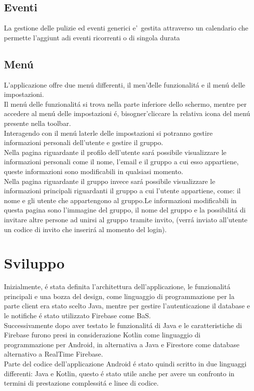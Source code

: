 \subsection{Eventi}
La gestione delle pulizie ed eventi generici e'\ gestita attraverso un calendario
che permette l'aggiunt adi eventi ricorrenti o di singola durata




\subsection{Men\'u}
L'applicazione offre due men\'u differenti, il men'\u delle funzionalit\'a e il men\'u delle impostazioni.\\
Il men\'u delle funzionalit\'a si trova nella parte inferiore dello schermo, mentre per accedere al men\'u delle impostazioni \'e, bisogner'\a cliccare la relativa icona del men\'u presente nella toolbar.\\
Interagendo con il men\'u laterle delle impostazioni si potranno gestire informazioni personali dell'utente e gestire il gruppo.\\
Nella pagina riguardante il profilo dell'utente sar\'a possibile visualizzare le informazioni personali come il nome, l'email e il gruppo a cui esso appartiene, queste informazioni sono modificabili in qualsiasi momento.\\
Nella pagina riguardante il gruppo invece sar\'a possibile visualizzare le informazioni principali riguardanti il gruppo a cui l'utente appartiene, come: il nome e gli utente che appartengono al gruppo.Le informazioni modificabili in questa pagina sono l'immagine del gruppo, il nome del gruppo e la possibilit\'a di invitare altre persone ad unirsi al gruppo tramite invito, (verr\'a inviato all'utente un codice di invito che inserir\'a al momento del login).\\




\section{Sviluppo}                 %
Inizialmente, \'e stata definita l'architettura dell'applicazione, le funzionalit\'a principali e una bozza del design, come linguaggio di programmazione per la parte client era stato scelto Java, mentre per gestire l'autenticazione il database e le notifiche \'e stato utilizzato  Firebase come BaS.\\
Successivamente dopo aver testato le funzionalit\'a di Java e le caratteristiche di Firebase furono presi in considerazione Kotlin come linguaggio di programmazione per Android, in alternativa a Java e Firestore come database alternativo a RealTime Firebase.\\
Parte del codice dell'applicazione Android \'e stato quindi scritto in due linguaggi differenti: Java e Kotlin, questo \'e stato utile anche per avere un confronto in termini di prestazione complessit\'a e linee di codice.


